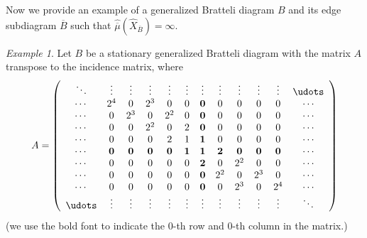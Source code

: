 \documentclass[11pt,reqno]{amsart}
\theoremstyle{definition}
\theoremstyle{remark}
\newtheorem{example}[definition]{Example}
\theoremstyle{plain}
\def\ol{\overline}
\def\ov{\overline}
\numberwithin{equation}{section}
\begin{document}
Now we provide an example of a generalized Bratteli diagram $B$ and its edge subdiagram $\ov B$ such that $\widehat{\overline{\mu}}(\widehat{X}_{\ol B}) = \infty$.

\begin{example}\label{ex: edge}
Let $B$ be a stationary generalized Bratteli diagram with the matrix $A$ transpose to the incidence matrix, where  
\begin{equation*}
A =  \left(
  \begin{array}{cccccccccccc}
   \ddots & \vdots & \vdots & \vdots & \vdots & \vdots & \vdots 
   & \vdots & \vdots & \vdots & \vdots & \udots\\
    \cdots & 2^4 & 0 & 2^3 & 0 & 0 & \textbf  0 & 0 & 0 & 0 & 0 & \cdots\\
    \cdots & 0 & 2^3 & 0 & 2^2 & 0 & \textbf 0 & 0 & 0 & 0 & 0 & \cdots\\
    \cdots & 0 & 0 & 2^2 & 0 & 2 & \textbf  0 & 0 & 0 & 0 & 0 & \cdots\\
    \cdots & 0 & 0 & 0 & 2 & 1 & \textbf 1 & 0 & 0 & 0 & 0 & \cdots\\
    \cdots & \textbf 0 & \textbf 0 &\textbf  0 &\textbf  0 &\textbf{1} & \textbf 1 & 
    \textbf{2} &\textbf 0 &\textbf 0 &\textbf 0 & \cdots\\
    \cdots & 0 & 0 & 0 & 0 & 0 & \textbf  2 & 0 & 2^2 & 0 & 0 & \cdots\\
    \cdots & 0 & 0 & 0 & 0 & 0 &\textbf  0 & 2^2 & 0 & 2^3 & 0 & \cdots\\
    \cdots & 0 & 0 & 0 & 0 & 0 &\textbf  0 & 0 & 2^3 & 0 & 2^4 & \cdots\\
    \udots & \vdots & \vdots & \vdots & \vdots & \vdots & \vdots & 
    \vdots & \vdots & \vdots & \vdots & \ddots\\
    \end{array}
\right)
\end{equation*} 
(we use the bold font to indicate the 0-th row and 0-th column in the matrix.)


\end{example}
\end{document}
